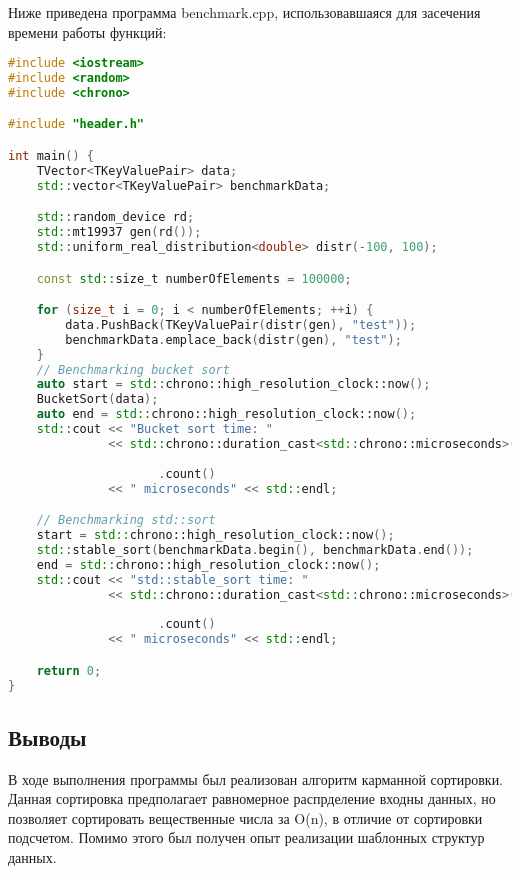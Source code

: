 \documentclass[12pt]{article}
\begin{document}
Ниже приведена программа benchmark.cpp, использовавшаяся для засечения времени работы функций:
\begin{lstlisting}[language=C++]
#include <iostream>
#include <random>
#include <chrono>

#include "header.h"

int main() {
    TVector<TKeyValuePair> data;
    std::vector<TKeyValuePair> benchmarkData;

    std::random_device rd;
    std::mt19937 gen(rd());
    std::uniform_real_distribution<double> distr(-100, 100);

    const std::size_t numberOfElements = 100000;

    for (size_t i = 0; i < numberOfElements; ++i) {
        data.PushBack(TKeyValuePair(distr(gen), "test"));
        benchmarkData.emplace_back(distr(gen), "test");
    }
    // Benchmarking bucket sort
    auto start = std::chrono::high_resolution_clock::now();
    BucketSort(data);
    auto end = std::chrono::high_resolution_clock::now();
    std::cout << "Bucket sort time: "
              << std::chrono::duration_cast<std::chrono::microseconds>(end -
                                                                       start)
                     .count()
              << " microseconds" << std::endl;

    // Benchmarking std::sort
    start = std::chrono::high_resolution_clock::now();
    std::stable_sort(benchmarkData.begin(), benchmarkData.end());
    end = std::chrono::high_resolution_clock::now();
    std::cout << "std::stable_sort time: "
              << std::chrono::duration_cast<std::chrono::microseconds>(end -
                                                                       start)
                     .count()
              << " microseconds" << std::endl;

    return 0;
}

\end{lstlisting}

\subsection*{Выводы}

В ходе выполнения программы был реализован алгоритм карманной сортировки. Данная сортировка предполагает равномерное распрделение
входны данных, но позволяет сортировать вещественные числа за O(n), в отличие от сортировки подсчетом.
Помимо этого был получен опыт реализации шаблонных структур данных.
\end{document}
